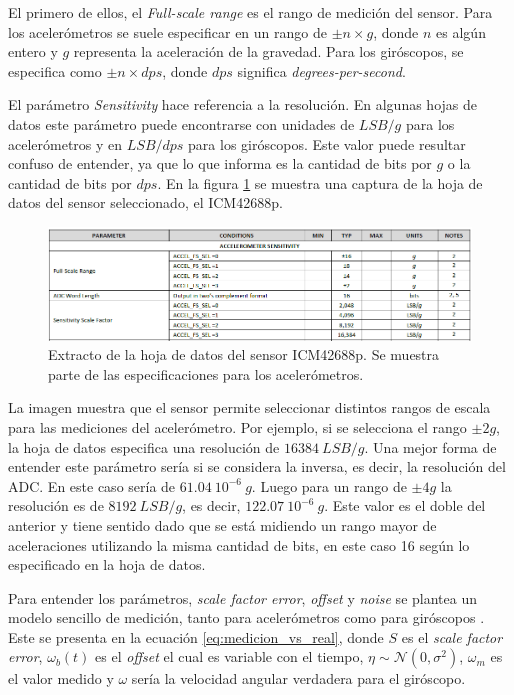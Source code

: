 El primero de ellos, el \textit{Full-scale range} es el rango de medición del sensor. Para los acelerómetros se suele especificar en un rango de $\pm n \times g$, donde $n$ es algún entero y $g$ representa la aceleración de la gravedad. Para los giróscopos, se especifica como $\pm n \times dps$, donde $dps$ significa \textit{degrees-per-second}.

El parámetro \textit{Sensitivity} hace referencia a la resolución. En algunas hojas de datos este parámetro puede encontrarse con unidades de $LSB/g$ para los acelerómetros y en $LSB/dps$ para los giróscopos. Este valor puede resultar confuso de entender, ya que lo que informa es la cantidad de bits por $g$ o la cantidad de bits por $dps$. En la figura \ref{fig:ICM_42688_datasheet} se muestra una captura de la hoja de datos del sensor seleccionado, el ICM42688p. 

\begin{figure}[htb]
    \centering
    \includegraphics[width=\textwidth]{img/ICM_42688_datasheet.png}
    \caption{Extracto de la hoja de datos del sensor ICM42688p. Se muestra parte de las especificaciones para los acelerómetros.}
    \label{fig:ICM_42688_datasheet}    
\end{figure}

La imagen muestra que el sensor permite seleccionar distintos rangos de escala para las mediciones del acelerómetro. Por ejemplo, si se selecciona el rango $\pm 2g$, la hoja de datos especifica una resolución de $16384 \ LSB/g$. Una mejor forma de entender este parámetro sería si se considera la inversa, es decir, la resolución del ADC. En este caso sería de $61.04 \ 10^{-6} \ g$. Luego para un rango de $\pm 4g$ la resolución es de $8192 \ LSB/g$, es decir, $122.07 \ 10^{-6} \ g$. Este valor es el doble del anterior y tiene sentido dado que se está midiendo un rango mayor de aceleraciones utilizando la misma cantidad de bits, en este caso 16 según lo especificado en la hoja de datos.

Para entender los parámetros, \textit{scale factor error}, \textit{offset} y \textit{noise} se plantea un modelo sencillo de medición, tanto para acelerómetros como para giróscopos \cite{borodacz2022review}. Este se presenta en la ecuación \eqref{eq:medicion_vs_real}, donde $S$ es el \textit{scale factor error}, $\omega_b(t)$ es el \textit{offset} el cual es variable con el tiempo, $\eta \sim \mathcal{N}(0,\sigma^2)$, $\omega_m$ es el valor medido y $\omega$ sería la velocidad angular verdadera para el giróscopo.

